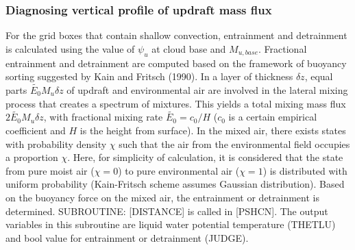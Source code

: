 \documentclass[platex, dvipdfmx]{article}
\begin{document}
\subsubsection{Diagnosing vertical profile of updraft mass flux}\label{diagnosing-vertical-profile-of-updraft-mass-flux}
For the grid boxes that contain shallow convection, entrainment and detrainment is calculated using the value of $\psi_u$ at cloud base and $M_{u,base}$.
Fractional entrainment and detrainment are computed based on the framework of buoyancy sorting suggested by Kain and Fritsch (1990).
In a layer of thickness $\delta z$, equal parts $\tilde{E_0} M_u \delta z$ of updraft and environmental air are involved in the lateral mixing process that creates a spectrum of mixtures.
This yields a total mixing mass flux $2\tilde{E_0} M_u \delta z$, with fractional mixing rate $\tilde{E_0}=c_0/H$ ($c_0$ is a certain empirical coefficient and $H$ is the height from surface).
In the mixed air, there exists states with probability density $\chi$ such that the air from the environmental field occupies a proportion $\chi$. Here, for simplicity of calculation, 
it is considered that the state from pure moist air ($\chi=0$) to pure environmental air ($\chi=1$) is distributed with uniform probability (Kain-Fritsch scheme assumes Gaussian distribution).
Based on the buoyancy force on the mixed air, the entrainment or detrainment is determined. SUBROUTINE: [DISTANCE] is called in [PSHCN].
The output variables in this subroutine are liquid water potential temperature (THETLU) and bool value for entrainment or detrainment (JUDGE).
\end{document}

